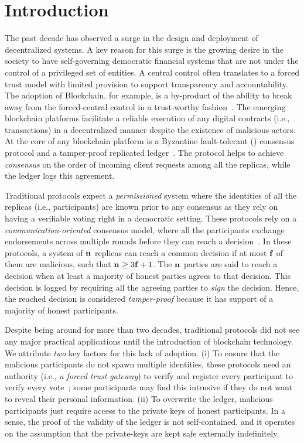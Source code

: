 \section{Introduction}  
\label{s:intro}
The past decade has observed a surge in the design and deployment of 
decentralized systems. A key reason for this surge is the growing desire in 
the society to have self-governing democratic financial systems that are not 
under the control of a privileged set of entities. A central control often 
translates to a forced trust model with limited provision to support 
transparency and accountability. The adoption of Blockchain, for example, 
is a by-product of the ability to break away from the forced-central control 
in a trust-worthy fashion~\cite{blockchain-book}. The emerging blockchain 
platforms facilitate a reliable execution of any digital contracts 
(i.e., transactions) in a decentralized manner despite the existence of malicious 
actors. At the core of any blockchain platform is a Byzantine 
fault-tolerant (\BFT{}) consensus protocol and a tamper-proof replicated 
ledger~\cite{bedrock,blockchain-book,scalable-ledger}. The \BFT{} 
protocol helps to achieve {\em consensus} on the order of incoming client 
requests among all the replicas, while the ledger logs this agreement. 

Traditional \BFT{} protocols expect a {\em permissioned} system where the 
identities of all the replicas (i.e., participants) are known prior to any 
consensus as they rely on having a verifiable voting right in a democratic 
setting. These protocols rely on a {\em communication-oriented} consensus 
model, where all the participants exchange endorsements across multiple 
rounds before they can reach a decision~\cite{sharper,pbftj,ahl,poe,rcc,geobft,flexitrust,ringbft,mirbft,basil,hotstuff}.
In these protocols, a system of $\mathbf{n}_{}$ replicas can reach a common decision 
if at most $\mathbf{f}_{}$ of them are malicious, such that $\mathbf{n}_{} \ge 3\mathbf{f}_{}+1$. 
The $\mathbf{n}_{}$ parties are said to reach a decision when at least a majority 
of honest parties agrees to that decision. This decision is logged by 
requiring all the agreeing parties to {\em sign} the decision. Hence, the 
reached decision is considered {\em tamper-proof} because it has support 
of a majority of honest participants.

Despite being around for more than two decades, traditional \BFT{} protocols 
did not see any major practical applications until the introduction of 
blockchain technology. We attribute {\em two} key factors for this lack of 
adoption. (i) To ensure that the malicious participants do not spawn multiple 
identities, these \BFT{} protocols need an authority (i.e., {\em a forced 
trust gateway}) to verify and register every participant to verify every 
vote~\cite{sybil-attack}; some participants may find this intrusive if they 
do not want to reveal their personal information. (ii) To overwrite the ledger, 
malicious participants just require access to the private keys of honest 
participants. In a sense, the proof of the validity of the ledger is not 
self-contained, and it operates on the assumption that the private-keys 
are kept safe externally indefinitely.

